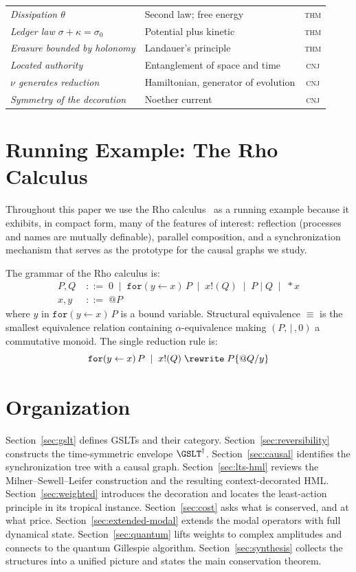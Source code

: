 \begin{center}
\begin{tabular}{>{\itshape}p{4.3cm} p{5.9cm} c}
Dissipation $\theta$          & Second law; free energy & \textsc{thm} \\
Ledger law $\sigma+\kappa=\sigma_0$ & Potential plus kinetic & \textsc{thm} \\
Erasure bounded by holonomy   & Landauer's principle & \textsc{thm} \\
Located authority             & Entanglement of space and time & \textsc{cnj} \\
$\nu$ generates reduction     & Hamiltonian, generator of evolution & \textsc{cnj} \\
Symmetry of the decoration    & Noether current & \textsc{cnj} \\
\bottomrule
\end{tabular}
\end{center}

\section{Running Example: The Rho Calculus}

Throughout this paper we use the Rho calculus~\cite{meredith2005rho} as a
running example because it exhibits, in compact form, many of the features of
interest: reflection (processes and names are mutually definable), parallel
composition, and a synchronization mechanism that serves as the prototype for
the causal graphs we study.

The grammar of the Rho calculus is:
\begin{align}
  P, Q &\;::=\; 0 \;\mid\; \mathtt{for}(y \leftarrow x)\,P \;\mid\;
               x!(Q) \;\mid\; P \mid Q \;\mid\; {*}x \\
  x, y &\;::=\; @P
\end{align}
where $y$ in $\mathtt{for}(y \leftarrow x)\,P$ is a bound variable.
Structural equivalence $\equiv$ is the smallest equivalence relation containing
$\alpha$-equivalence making $(P,\,|\,,0)$ a commutative monoid.
The single reduction rule is:
\[
  \mathtt{for}(y \leftarrow x)\,P \;\mid\; x!(Q)
  \;\rewrite\;
  P\{@Q / y\}
\]

\section{Organization}

Section~\ref{sec:gslt} defines GSLTs and their category.
Section~\ref{sec:reversibility} constructs the time-symmetric envelope $\GSLT^\dagger$.
Section~\ref{sec:causal} identifies the synchronization tree with a causal graph.
Section~\ref{sec:lts-hml} reviews the Milner--Sewell--Leifer construction and
the resulting context-decorated HML.
Section~\ref{sec:weighted} introduces the decoration and locates the
least-action principle in its tropical instance.
Section~\ref{sec:cost} asks what is conserved, and at what price.
Section~\ref{sec:extended-modal} extends the modal operators with full dynamical state.
Section~\ref{sec:quantum} lifts weights to complex amplitudes and connects to the
quantum Gillespie algorithm.
Section~\ref{sec:synthesis} collects the structures into a unified picture and
states the main conservation theorem.

